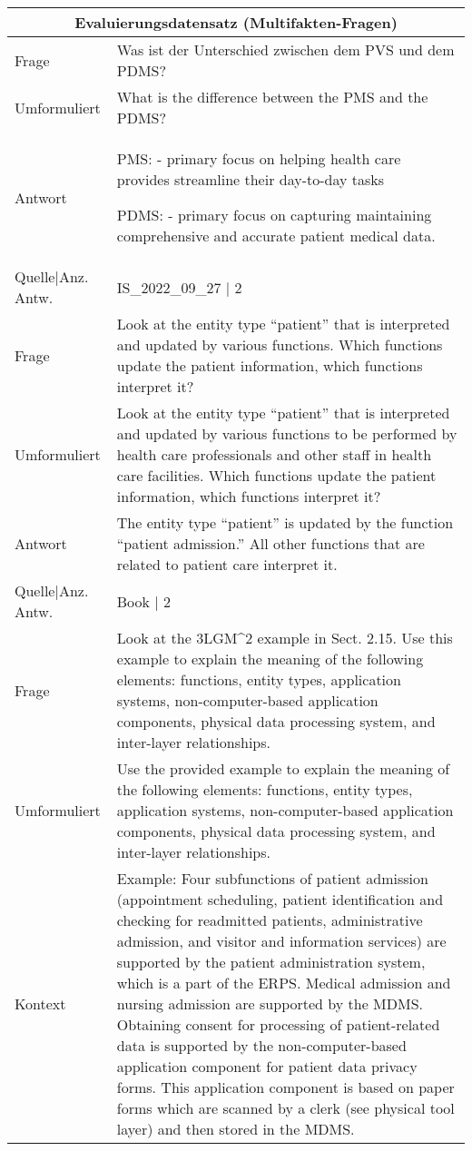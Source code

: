 {\begin{landscape}
    \begin{longtable}{p{3cm}p{}}
    \toprule
    \multicolumn{2}{c}{\textbf{Evaluierungsdatensatz (Multifakten-Fragen)}}\\
    \midrule
    Frage & Was ist der Unterschied zwischen dem PVS und dem PDMS? \\
    Umformuliert & What is the difference between the PMS and the PDMS? \\
    Antwort & PMS:
    - primary focus on helping health care provides streamline their day-to-day tasks

    PDMS:
    - primary focus on capturing maintaining comprehensive and accurate patient medical data.\\
    Quelle|Anz. Antw. &  IS\_2022\_09\_27  | 2 \\
    \midrule
    Frage & Look at the entity type ``patient'' that is interpreted and updated by various functions.
    Which functions update the patient information, which functions interpret it? \\
    Umformuliert & Look at the entity type ``patient'' that is interpreted and updated by various functions to be performed by health care professionals and other staff in health care facilities.
    Which functions update the patient information, which functions interpret it? \\
    Antwort & The entity type ``patient'' is updated by the function ``patient admission.'' All other functions that are related to patient care interpret it.\\
    Quelle|Anz. Antw. &  Book  | 2 \\
    \midrule
    Frage & Look at the 3LGM\textasciicircum{}2 example in Sect. 2.15.
    Use this example to explain the meaning of the following elements: functions, entity types, application systems, non-computer-based application components, physical data processing system, and inter-layer relationships.\\
    Umformuliert & Use the provided example to explain the meaning of the following elements: functions, entity types, application systems, non-computer-based application components, physical data processing system, and inter-layer relationships.\\
    Kontext & Example: Four subfunctions of patient admission (appointment scheduling, patient identification and checking for readmitted patients, administrative admission, and visitor and information services) are supported by the patient administration system, which is a part of the ERPS.
    Medical admission and nursing admission are supported by the MDMS.
    Obtaining consent for processing of patient-related data is supported by the non-computer-based application component for patient data privacy forms.
    This application component is based on paper forms which are scanned by a clerk (see physical tool layer) and then stored in the MDMS.


\end{longtable}
\end{landscape}}
